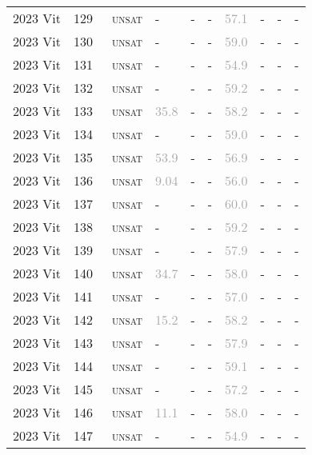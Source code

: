 \begin{center}
{\begin{longtable}{@{}llllllllll@{}}
2023 Vit & 129 & ~\textsc{unsat} & - & - & - & \textcolor{darkgray}{57.1} & - & - & - \\
2023 Vit & 130 & ~\textsc{unsat} & - & - & - & \textcolor{darkgray}{59.0} & - & - & - \\
2023 Vit & 131 & ~\textsc{unsat} & - & - & - & \textcolor{darkgray}{54.9} & - & - & - \\
2023 Vit & 132 & ~\textsc{unsat} & - & - & - & \textcolor{darkgray}{59.2} & - & - & - \\
2023 Vit & 133 & ~\textsc{unsat} & \textcolor{darkgray}{35.8} & - & - & \textcolor{darkgray}{58.2} & - & - & - \\
2023 Vit & 134 & ~\textsc{unsat} & - & - & - & \textcolor{darkgray}{59.0} & - & - & - \\
2023 Vit & 135 & ~\textsc{unsat} & \textcolor{darkgray}{53.9} & - & - & \textcolor{darkgray}{56.9} & - & - & - \\
2023 Vit & 136 & ~\textsc{unsat} & \textcolor{darkgray}{9.04} & - & - & \textcolor{darkgray}{56.0} & - & - & - \\
2023 Vit & 137 & ~\textsc{unsat} & - & - & - & \textcolor{darkgray}{60.0} & - & - & - \\
2023 Vit & 138 & ~\textsc{unsat} & - & - & - & \textcolor{darkgray}{59.2} & - & - & - \\
2023 Vit & 139 & ~\textsc{unsat} & - & - & - & \textcolor{darkgray}{57.9} & - & - & - \\
2023 Vit & 140 & ~\textsc{unsat} & \textcolor{darkgray}{34.7} & - & - & \textcolor{darkgray}{58.0} & - & - & - \\
2023 Vit & 141 & ~\textsc{unsat} & - & - & - & \textcolor{darkgray}{57.0} & - & - & - \\
2023 Vit & 142 & ~\textsc{unsat} & \textcolor{darkgray}{15.2} & - & - & \textcolor{darkgray}{58.2} & - & - & - \\
2023 Vit & 143 & ~\textsc{unsat} & - & - & - & \textcolor{darkgray}{57.9} & - & - & - \\
2023 Vit & 144 & ~\textsc{unsat} & - & - & - & \textcolor{darkgray}{59.1} & - & - & - \\
2023 Vit & 145 & ~\textsc{unsat} & - & - & - & \textcolor{darkgray}{57.2} & - & - & - \\
2023 Vit & 146 & ~\textsc{unsat} & \textcolor{darkgray}{11.1} & - & - & \textcolor{darkgray}{58.0} & - & - & - \\
2023 Vit & 147 & ~\textsc{unsat} & - & - & - & \textcolor{darkgray}{54.9} & - & - & - \\

\end{longtable}}
\end{center}
